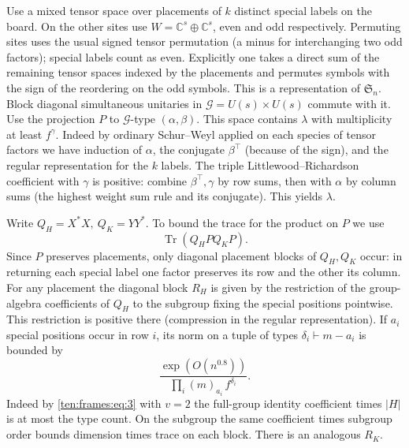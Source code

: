 Use a mixed tensor space over placements of \(k\) distinct special labels on the board. On the other sites use \(W=\mathbb C^s\oplus\mathbb C^s\), even and odd respectively. Permuting sites uses the usual signed tensor permutation (a minus for interchanging two odd factors); special labels count as even. Explicitly one takes a direct sum of the remaining tensor spaces indexed by the placements and permutes symbols with the sign of the reordering on the odd symbols. This is a representation of \(\mathfrak S_n\). Block diagonal simultaneous unitaries in \(\mathcal G=U(s)\times U(s)\) commute with it. Use the projection \(P\) to \(\mathcal G\)-type \((\alpha,\beta)\). This space contains \(\lambda\) with multiplicity at least \(f^\gamma\). Indeed by ordinary Schur--Weyl applied on each species of tensor factors we have induction of \(\alpha\), the conjugate \(\beta^\intercal\) (because of the sign), and the regular representation for the \(k\) labels. The triple Littlewood--Richardson coefficient with \(\gamma\) is positive: combine \(\beta^\intercal,\gamma\) by row sums, then with \(\alpha\) by column sums (the highest weight sum rule and its conjugate). This yields \(\lambda\).

Write \(Q_H=X^*X,\ Q_K=YY^*\). To bound the trace for the product on \(P\) we use
\[
 \operatorname{Tr}(Q_H P Q_K P).
\]
Since \(P\) preserves placements, only diagonal placement blocks of \(Q_H,Q_K\) occur: in returning each special label one factor preserves its row and the other its column. For any placement the diagonal block \(R_H\) is given by the restriction of the group-algebra coefficients of \(Q_H\) to the subgroup fixing the special positions pointwise. This restriction is positive there (compression in the regular representation). If \(a_i\) special positions occur in row \(i\), its norm on a tuple of types \(\delta_i\vdash m-a_i\) is bounded by
\begin{equation}
 \frac{\exp(O(n^{0.8}))}{\prod_i (m)_{a_i}\, f^{\delta_i}} .
 \label{ten:frames:eq:12}
\end{equation}
Indeed by \eqref{ten:frames:eq:3} with \(v=2\) the full-group identity coefficient times \(|H|\) is at most the type count. On the subgroup the same coefficient times subgroup order bounds dimension times trace on each block. There is an analogous \(R_K\).

